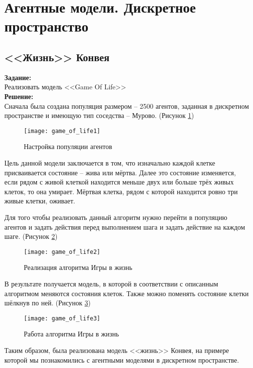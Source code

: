 \section*{Агентные модели. Дискретное пространство}
\subsection*{<<Жизнь>> Конвея}

\textbf{Задание:}\\
Реализовать модель <<Game Of Life>>\\

\textbf{Решение:}\\
Сначала была создана популяция размером -- 2500 агентов, заданная в дискретном пространстве и имеющую тип соседства -- Мурово. (Рисунок \ref{fig:game_of_life1})
\begin{figure}[h]
	\centering \texttt{[image: game\_of\_life1]}
	\caption{Настройка популяции агентов}
	\label{fig:game_of_life1}
\end{figure}

Цель данной модели заключается в том, что изначально каждой клетке присваивается состояние -- жива или мёртва. Далее это состояние изменяется, если рядом с живой клеткой находится меньше двух или больше трёх живых клеток, то она умирает. Мёртвая клетка, рядом с которой находится ровно три живые клетки, оживает.\\

\newpage

Для того чтобы реализовать данный алгоритм нужно перейти в популяцию агентов и задать действия перед выполнением шага и задать действие на каждом шаге. (Рисунок \ref{fig:game_of_life2})
\begin{figure}[h]
	\centering \texttt{[image: game\_of\_life2]}
	\caption{Реализация алгоритма Игры в жизнь}
	\label{fig:game_of_life2}
\end{figure}

В результате получается модель, в которой в соответствии с описанным алгоритмом меняются состояния клеток. Также можно поменять состояние клетки шёлкнув по ней. (Рисунок \ref{fig:game_of_life3})
\begin{figure}[h]
	\centering \texttt{[image: game\_of\_life3]}
	\caption{Работа алгоритма Игры в жизнь}
	\label{fig:game_of_life3}
\end{figure}

Таким образом, была реализована модель <<жизнь>> Конвея, на примере которой мы познакомились с агентными моделями в дискретном пространстве.\\